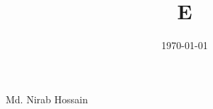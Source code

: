 \documentclass[a4paper, 12pt]{article}
\begin{document}
	\title{E}
	\date{\today}
	\maketitle
	Md. Nirab Hossain
\end{document}

